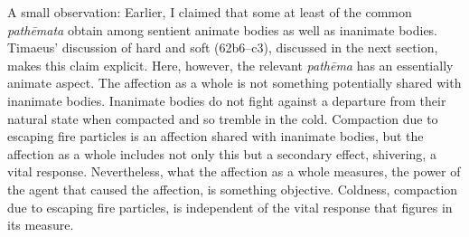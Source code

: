 A small observation: Earlier, I claimed that some at least of the common \emph{pathēmata} obtain among sentient animate bodies as well as inanimate bodies. Timaeus' discussion of hard and soft (62b6–c3), discussed in the next section, makes this claim explicit. Here, however, the relevant \emph{pathēma} has an essentially animate aspect. The affection as a whole is not something potentially shared with inanimate bodies. Inanimate bodies do not fight against a departure from their natural state when compacted and so tremble in the cold. Compaction due to escaping fire particles is an affection shared with inanimate bodies, but the affection as a whole includes not only this but a secondary effect, shivering, a vital response. Nevertheless, what the affection as a whole measures, the power of the agent that caused the affection, is something objective. Coldness, compaction due to escaping fire particles, is independent of the vital response that figures in its measure.

